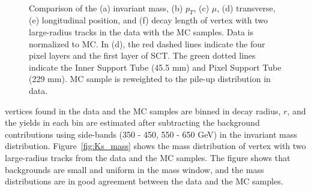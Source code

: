 \begin{figure}[!htb]
     \\
    \caption{Comparison of the (a) invariant mass, (b) $p_{T}$, (c) $\mu$, (d) transverse, (e) longitudinal position, and (f) decay length of \Ks vertex with two large-radius tracks in the data with the MC samples. Data is normalized to MC. In (d), the red dashed lines indicate the four pixel layers and the first layer of SCT. The green dotted lines indicate the Inner Support Tube (45.5 mm) and Pixel Support Tube (229 mm). MC sample is reweighted to the pile-up distribution in data.}
    \label{fig:Ks_data_MC}
\end{figure}

\Ks vertices found in the data and the MC samples are binned in decay radius, $r$, and the \Ks yields in each bin are estimated after subtracting the background contributions using side-bands (350 - 450, 550 - 650 GeV) in the invariant mass distribution. Figure~\ref{fig:Ks_mass} shows the mass distribution of \Ks vertex with two large-radius tracks from the data and the MC samples. The figure shows that backgrounds are small and uniform in the mass window, and the mass distributions are in good agreement between the data and the MC samples.

